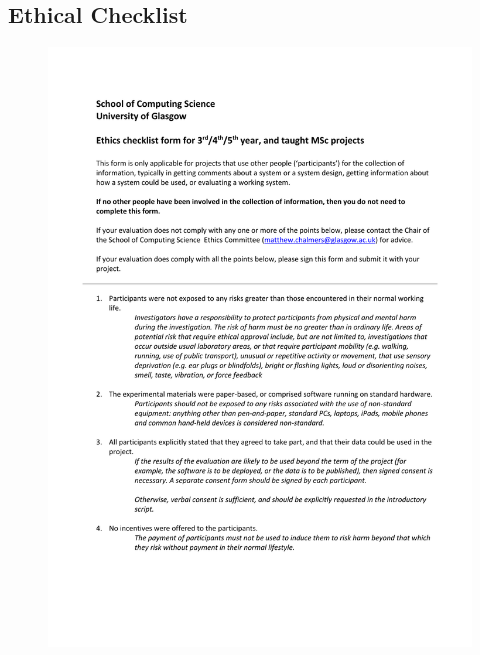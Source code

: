\documentclass{l4proj}
\begin{document}
\begin{appendices}
\chapter{Ethical Checklist}
\label{Ethical Checklist}

\begin{figure}[h!]
  \centering
  \begin{adjustbox}{center,max height=0.8\textheight, max width=\linewidth}
    \includegraphics{images/Nader_Ethical_Checklist_1-1.pdf}
  \end{adjustbox}
\end{figure}


\end{appendices}
\end{document}
